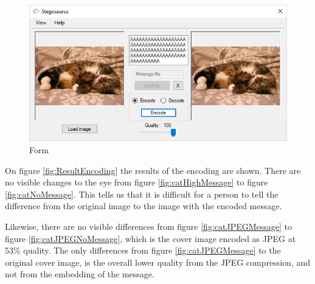 \begin{figure}
	\centering
	\includegraphics[width=.7\textwidth]{figures/formShown.png}
	\caption{Form}
	\label{fig:formApp}
\end{figure}

On figure \ref{fig:ResultEncoding} the results of the encoding are shown. There are no visible changes to the eye from figure \ref{fig:catHighMessage} to figure \ref{fig:catNoMessage}. This tells us that it is difficult for a person to tell the difference from the original image to the image with the encoded message. 

Likewise, there are no visible differences from figure \ref{fig:catJPEGMessage} to figure \ref{fig:catJPEGNoMessage}, which is the cover image encoded as JPEG at 53\% quality. The only differences from figure \ref{fig:catJPEGMessage} to the original cover image, is the overall lower quality from the JPEG compression, and not from the embedding of the message.

